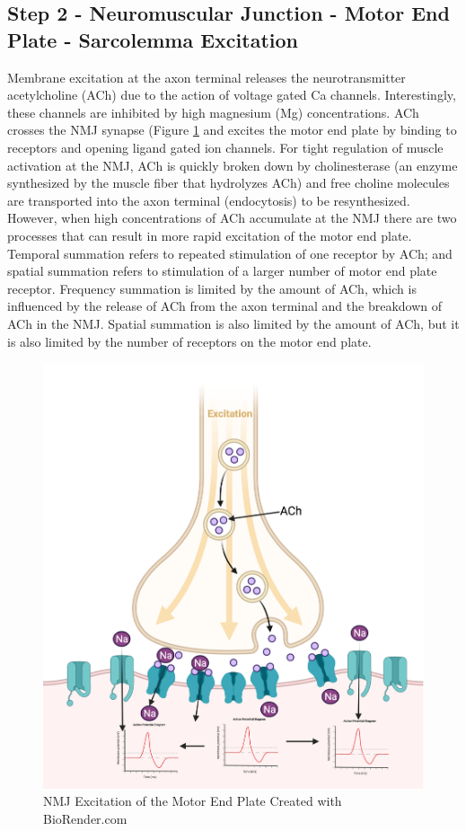 \subsection{Step 2 - Neuromuscular Junction - Motor End Plate - Sarcolemma Excitation}

Membrane excitation at the axon terminal releases the neurotransmitter acetylcholine (ACh) due to the action of voltage gated Ca channels. Interestingly, these channels are inhibited by high magnesium (Mg) concentrations. ACh crosses the NMJ synapse (Figure \ref{fig:NMJ} and excites the motor end plate by binding to receptors and opening ligand gated ion channels. For tight regulation of muscle activation at the NMJ, ACh is quickly broken down by cholinesterase (an enzyme synthesized by the muscle fiber that hydrolyzes ACh) and free choline molecules are transported into the axon terminal (endocytosis) to be resynthesized. However, when high concentrations of ACh accumulate at the NMJ there are two processes that can result in more rapid excitation of the motor end plate. Temporal summation refers to repeated stimulation of one receptor by ACh; and spatial summation refers to stimulation of a larger number of motor end plate receptor. Frequency summation is limited by the amount of ACh, which is influenced by the release of ACh from the axon terminal and the breakdown of ACh in the NMJ. Spatial summation is also limited by the amount of ACh, but it is also limited by the number of receptors on the motor end plate.


\begin{figure}[!ht]
    \centering
    \includegraphics[width=1\linewidth]{./figure/NMJ.png}
    \caption{NMJ Excitation of the Motor End Plate \footnotesize{Created with BioRender.com}}
    \label{fig:NMJ}
\end{figure}


